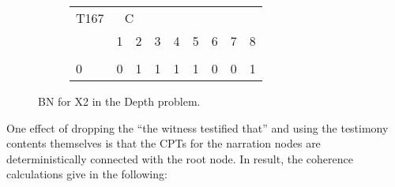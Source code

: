 \documentclass[10pt,]{scrartcl}
\begin{document}
\begin{figure}
{\begin{subfigure}[!ht]{0.3\textwidth}
\begin{table}[H]
\centering
\begin{tabular}{lrrrrrrrr}
\toprule
\multicolumn{1}{c}{T167} & \multicolumn{2}{c}{C} \\
  & 1 & 2 & 3 & 4 & 5 & 6 & 7 & 8\\
\midrule
\cellcolor{gray!6}{1} & \cellcolor{gray!6}{1} & \cellcolor{gray!6}{0} & \cellcolor{gray!6}{0} & \cellcolor{gray!6}{0} & \cellcolor{gray!6}{0} & \cellcolor{gray!6}{1} & \cellcolor{gray!6}{1} & \cellcolor{gray!6}{0}\\
0 & 0 & 1 & 1 & 1 & 1 & 0 & 0 & 1\\
\bottomrule
\end{tabular}
\end{table}
\end{subfigure}}
\caption{BN for \textsf{X2} in the \textsf{Depth} problem.}
\label{fig:dod2}
\end{figure}

\newpage

One effect of dropping the ``the witness testified that'' and using the
testimony contents themselves is that the CPTs for the narration nodes
are deterministically connected with the root node. In result, the
coherence calculations give in the following:

\begin{table}[H]
\centering
{}
\end{table}

\begin{table}[H]
\centering
{}
\end{table}
\end{document}
